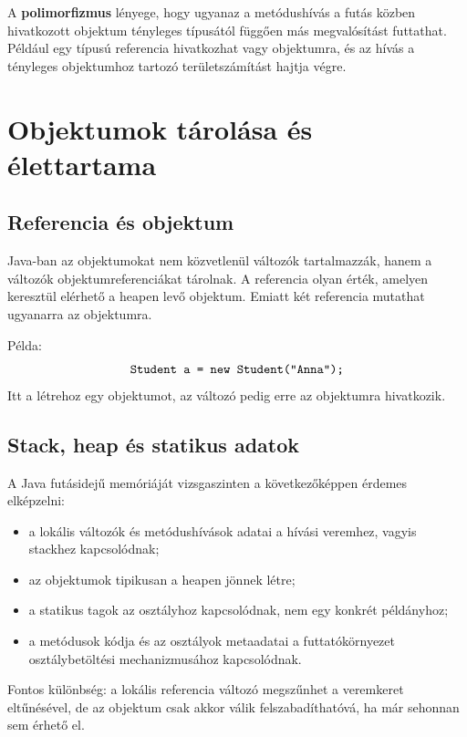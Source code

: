A \textbf{polimorfizmus} lényege, hogy ugyanaz a metódushívás a futás közben hivatkozott objektum tényleges típusától függően más megvalósítást futtathat. Például egy  típusú referencia hivatkozhat  vagy  objektumra, és az  hívás a tényleges objektumhoz tartozó területszámítást hajtja végre.

\section{Objektumok tárolása és élettartama}

\subsection{Referencia és objektum}

Java-ban az objektumokat nem közvetlenül változók tartalmazzák, hanem a változók objektumreferenciákat tárolnak. A referencia olyan érték, amelyen keresztül elérhető a heapen levő objektum. Emiatt két referencia mutathat ugyanarra az objektumra.

Példa:
\[
  \texttt{Student a = new Student("Anna");}
\]
Itt a  létrehoz egy objektumot, az  változó pedig erre az objektumra hivatkozik.

\subsection{Stack, heap és statikus adatok}

A Java futásidejű memóriáját vizsgaszinten a következőképpen érdemes elképzelni:

\begin{itemize}
  \item a lokális változók és metódushívások adatai a hívási veremhez, vagyis stackhez kapcsolódnak;
  \item az objektumok tipikusan a heapen jönnek létre;
  \item a statikus tagok az osztályhoz kapcsolódnak, nem egy konkrét példányhoz;
  \item a metódusok kódja és az osztályok metaadatai a futtatókörnyezet osztálybetöltési mechanizmusához kapcsolódnak.
\end{itemize}

Fontos különbség: a lokális referencia változó megszűnhet a veremkeret eltűnésével, de az objektum csak akkor válik felszabadíthatóvá, ha már sehonnan sem érhető el.

